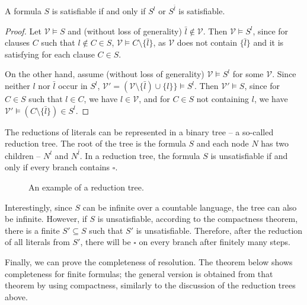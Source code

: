\begin{lemma}
A formula $S$ is satisfiable if and only if $S^l$ or $S^{\bar{l}}$ is satisfiable.
\end{lemma}
\begin{proof}
Let $\mathcal{V} \vDash S$ and (without loss of generality) $\bar{l} \notin \mathcal{V}$. Then $\mathcal{V} \vDash S^l$, since for clauses $C$ such that $l \notin C \in S$, $\mathcal{V} \vDash C \setminus \{\bar{l}\}$, as $\mathcal{V}$ does not contain $\{\bar{l}\}$ and it is satisfying for each clause $C \in S$.

On the other hand, assume (without loss of generality) $\mathcal{V} \vDash S^l$ for some $\mathcal{V}$. Since neither $l$ nor $\bar{l}$ occur in $S^l$, $\mathcal{V}' = (\mathcal{V} \setminus \{\bar{l}) \cup \{l\}\} \vDash S^l$. Then $\mathcal{V}' \vDash S$, since for $C \in S$ such that $l \in C$, we have $l \in \mathcal{V}$, and for $C \in S$ not containing $l$, we have $\mathcal{V}' \vDash (C \setminus \{\bar{l}\}) \in S^l$.
\end{proof}

The reductions of literals can be represented in a binary tree -- a so-called reduction tree. The root of the tree is the formula $S$ and each node $N$ has two children -- $N^l$ and $N^{\bar{l}}$. In a reduction tree, the formula $S$ is unsatisfiable if and only if every branch contains $\square$.

\begin{figure}
\centering
{}
\caption{An example of a reduction tree.}
\end{figure}

Interestingly, since $S$ can be infinite over a countable language, the tree can also be infinite. However, if $S$ is unsatisfiable, according to the compactness theorem, there is a finite $S' \subseteq S$ such that $S'$ is unsatisfiable. Therefore, after the reduction of all literals from $S'$, there will be $\square$ on every branch after finitely many steps.

Finally, we can prove the completeness of resolution. The theorem below shows completeness for finite formulas; the general version is obtained from that theorem by using compactness, similarly to the discussion of the reduction trees above.

